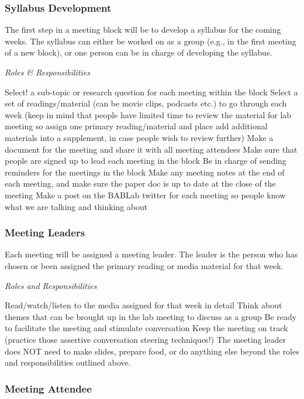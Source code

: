 \documentclass[]{book}
\begin{document}
\hypertarget{syllabus-development}{%
\subsubsection{Syllabus Development}\label{syllabus-development}}

The first step in a meeting block will be to develop a syllabus for the coming weeks. The syllabus can either be worked on as a group (e.g., in the first meeting of a new block), or one person can be in charge of developing the syllabus.

\emph{Roles \& Responsibilities}

Select! a sub-topic or research question for each meeting within the block
Select a set of readings/material (can be movie clips, podcasts etc.) to go through each week (keep in mind that people have limited time to review the material for lab meeting so assign one primary reading/material and place add additional materials into a supplement, in case people wish to review further)
Make a document for the meeting and share it with all meeting attendees
Make sure that people are signed up to lead each meeting in the block
Be in charge of sending reminders for the meetings in the block
Make any meeting notes at the end of each meeting, and make sure the paper doc is up to date at the close of the meeting
Make a post on the BABLab twitter for each meeting so people know what we are talking and thinking about

\hypertarget{meeting-leaders}{%
\subsubsection{Meeting Leaders}\label{meeting-leaders}}

Each meeting will be assigned a meeting leader. The leader is the person who has chosen or been assigned the primary reading or media material for that week.

\emph{Roles and Responsibilities}

Read/watch/listen to the media assigned for that week in detail
Think about themes that can be brought up in the lab meeting to discuss as a group
Be ready to facilitate the meeting and stimulate conversation
Keep the meeting on track (practice those assertive conversation steering techniques!)
The meeting leader does NOT need to make slides, prepare food, or do anything else beyond the roles and responsibilities outlined above.

\hypertarget{meeting-attendee}{%
\subsubsection{Meeting Attendee}\label{meeting-attendee}}
\end{document}
